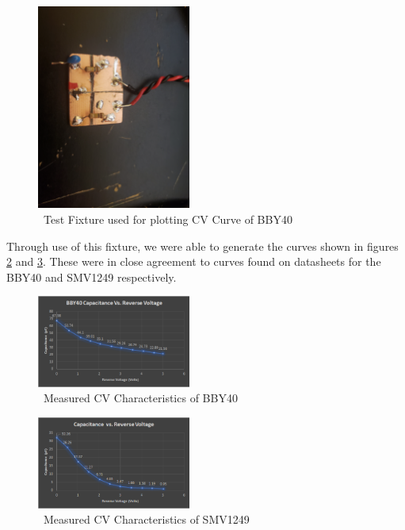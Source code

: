 \documentclass[journal]{IEEEtran}
\begin{document}
\begin{figure}[htb]
\centering
\includegraphics[width=0.45\textwidth]{BBY40_capacitance_testfixture}
\caption{\ Test Fixture used for plotting CV Curve of BBY40
}\label{fig:CVTestFixt}
\end{figure}



Through use of this fixture, we were able to generate the curves shown in figures \ref{fig:BBY40CV} and \ref{fig:SMV1249CV}. These were in close agreement to curves found on datasheets for the BBY40 and SMV1249 respectively.
 
\begin{figure}[htb]
\centering
\includegraphics[width=0.45\textwidth]{bbY40CV}
\caption{\ Measured CV Characteristics of BBY40 
}\label{fig:BBY40CV}
\end{figure}
 
 
\begin{figure}[htb]
\centering
\includegraphics[width=0.45\textwidth]{SMV1249_CV}
\caption{\ Measured CV Characteristics of SMV1249 
}\label{fig:SMV1249CV}
\end{figure}
\end{document}
